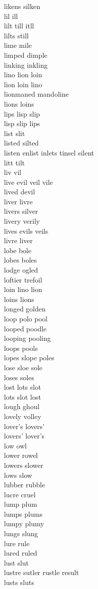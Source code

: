 likens silken\\
lil ill\\
lilt till itll\\
lilts still\\
lime mile\\
limped dimple\\
linking inkling\\
lino lion loin\\
lion loin lino\\
lionmaned mandoline\\
lions loins\\
lips lisp slip\\
lisp slip lips\\
list slit\\
listed silted\\
listen enlist inlets tinsel silent\\
litt tilt\\
liv vil\\
live evil veil vile\\
lived devil\\
liver livre\\
livers silver\\
livery verily\\
lives evils veils\\
livre liver\\
lobe bole\\
lobes boles\\
lodge ogled\\
loftier trefoil\\
loin lino lion\\
loins lions\\
longed golden\\
loop polo pool\\
looped poodle\\
looping pooling\\
loops pools\\
lopes slope poles\\
lose sloe sole\\
loses soles\\
lost lots slot\\
lots slot lost\\
lough ghoul\\
lovely volley\\
lover's lovers'\\
lovers' lover's\\
low owl\\
lower rowel\\
lowers slower\\
lows slow\\
lubber rubble\\
lucre cruel\\
lump plum\\
lumps plums\\
lumpy plumy\\
lungs slung\\
lure rule\\
lured ruled\\
lust slut\\
lustre sutler rustle result\\
lusts sluts\\

